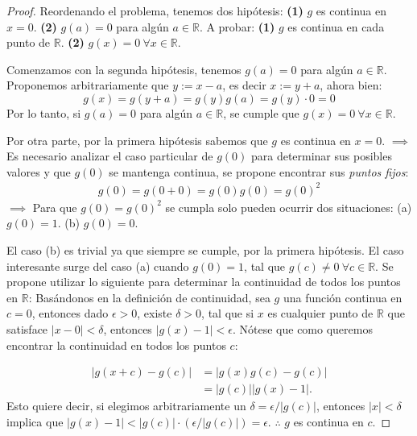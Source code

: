 \begin{proof} Reordenando el problema, tenemos dos hipótesis: \textbf{(1)} $g$ es continua en $x=0$. \textbf{(2)} $g(a)=0$ para algún $a\in \mathbb{R}$. 
A probar: \textbf{(1)} $g$ es continua en cada punto de $\mathbb{R}$. \textbf{(2)} $g(x)=0\ \forall x\in\mathbb{R}$. 

\linita 

Comenzamos con la segunda hipótesis, tenemos $g(a)=0$ para algún $a\in\mathbb{R}$. Proponemos arbitrariamente que $y:= x-a$, es decir $x:=y+a$, ahora bien: 
$$g(x)=g(y+a)=g(y)g(a)=g(y)\cdot 0 = 0 $$
Por lo tanto, si $g(a)=0$ para algún $a\in\mathbb{R}$, se cumple que $g(x)=0\ \forall x\in\mathbb{R}$.

\linita 

Por otra parte, por la primera hipótesis sabemos que $g$ es continua en $x=0$. $\implies$ Es necesario analizar el caso particular de $g(0)$ para determinar sus posibles valores y que $g(0)$ se mantenga continua, se propone encontrar sus \textit{puntos fijos}:
\begin{gather*}
    g(0)=g(0+0)=g(0)g(0)=g(0)^2
\end{gather*}
$\implies$ Para que $g(0)=g(0)^2$ se cumpla solo pueden ocurrir dos situaciones: (a) $g(0)=1$. (b) $g(0)=0$. 

\linita 

El caso (b) es trivial ya que siempre se cumple, por la primera hipótesis. El caso interesante surge del caso (a) cuando $g(0)=1$, tal que $g(c)\neq 0\ \forall c\in\mathbb{R}$. Se propone utilizar lo siguiente para determinar la continuidad de todos los puntos en $\mathbb{R}$: Basándonos en la definición de continuidad, sea $g$ una función continua en $c=0$, entonces dado $\epsilon>0$, existe $\delta>0$, tal que si $x$ es cualquier punto de $\mathbb{R}$ que satisface $|x-0|<\delta$, entonces $|g(x)-1|<\epsilon$. Nótese que como queremos encontrar la continuidad en todos los puntos $c$: 

\begin{align*}
    |g(x+c)-g(c)|&= |g(x)g(c)-g(c)|\\
                &= |g(c)||g(x)-1|. 
\end{align*}
Esto quiere decir, si elegimos arbitrariamente un $\delta=\epsilon/|g(c)|$, entonces $|x|<\delta$ implica que $|g(x)-1|<|g(c)|\cdot(\epsilon/|g(c)|)=\epsilon$. $\therefore$ $g$ es continua en $c$.
\end{proof}